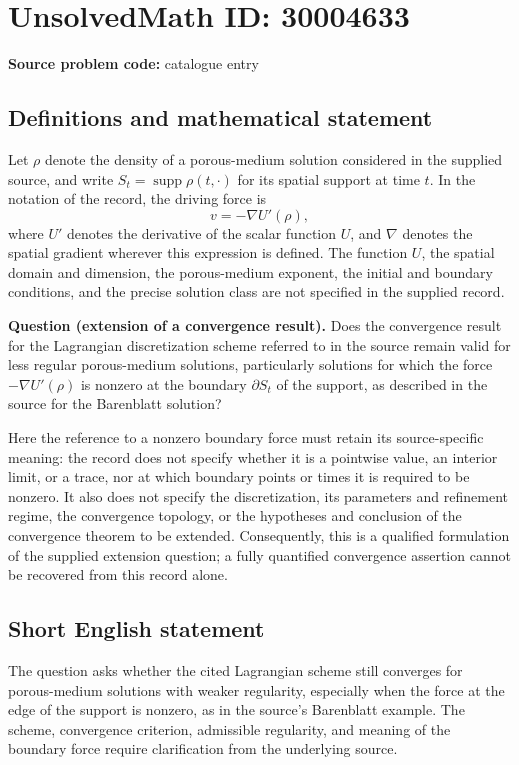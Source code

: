 \documentclass[11pt]{article}
\begin{document}
\section*{UnsolvedMath ID: 30004633}
\textbf{Source problem code:} catalogue entry
\subsection{Definitions and mathematical statement}
Let \(\rho\) denote the density of a porous-medium solution considered in the supplied source, and write \(S_t=\operatorname{supp}\rho(t,\cdot)\) for its spatial support at time \(t\). In the notation of the record, the driving force is
\[
 v=-\nabla U'(\rho),
\]
where \(U'\) denotes the derivative of the scalar function \(U\), and \(\nabla\) denotes the spatial gradient wherever this expression is defined. The function \(U\), the spatial domain and dimension, the porous-medium exponent, the initial and boundary conditions, and the precise solution class are not specified in the supplied record.

\textbf{Question (extension of a convergence result).} Does the convergence result for the Lagrangian discretization scheme referred to in the source remain valid for less regular porous-medium solutions, particularly solutions for which the force \(-\nabla U'(\rho)\) is nonzero at the boundary \(\partial S_t\) of the support, as described in the source for the Barenblatt solution?

Here the reference to a nonzero boundary force must retain its source-specific meaning: the record does not specify whether it is a pointwise value, an interior limit, or a trace, nor at which boundary points or times it is required to be nonzero. It also does not specify the discretization, its parameters and refinement regime, the convergence topology, or the hypotheses and conclusion of the convergence theorem to be extended. Consequently, this is a qualified formulation of the supplied extension question; a fully quantified convergence assertion cannot be recovered from this record alone.
\subsection{Short English statement}
The question asks whether the cited Lagrangian scheme still converges for porous-medium solutions with weaker regularity, especially when the force at the edge of the support is nonzero, as in the source's Barenblatt example. The scheme, convergence criterion, admissible regularity, and meaning of the boundary force require clarification from the underlying source.
\end{document}
